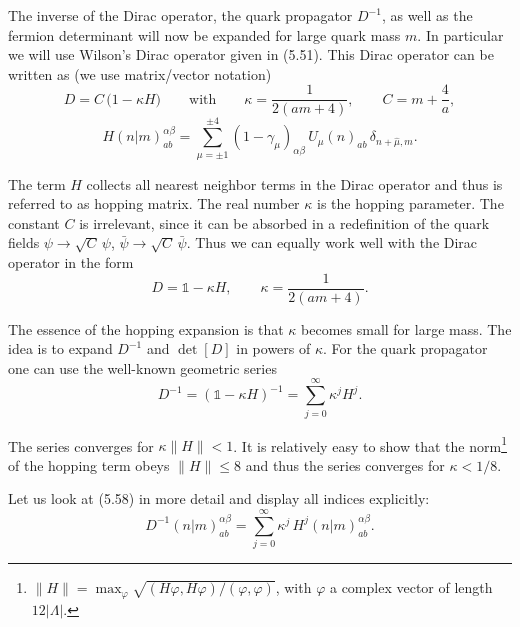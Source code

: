 The inverse of the Dirac operator, the quark propagator $D^{-1}$, as well as
the fermion determinant will now be expanded for large quark mass $m$. In
particular we will use Wilson's Dirac operator given in (5.51). This Dirac
operator can be written as (we use matrix/vector notation)
\begin{equation}
  D = C\,\big(1 - \kappa H\big)
  \qquad \text{with} \qquad
  \kappa = \frac{1}{2(am+4)}, \qquad C = m + \frac{4}{a},
\end{equation}
\begin{equation}
  H(n|m)^{\alpha\beta}_{ab} = \sum_{\mu=\pm1}^{\pm4}(1-\gamma_\mu)_{\alpha\beta}\,
    U_\mu(n)_{ab}\,\delta_{n+\hat{\mu},m} .
\end{equation}

The term $H$ collects all nearest neighbor terms in the Dirac operator and thus
is referred to as hopping matrix. The real number $\kappa$ is the hopping parameter.
The constant $C$ is irrelevant, since it can be absorbed in a redefinition of the
quark fields $\psi \to \sqrt{C}\,\psi$, $\bar{\psi} \to \sqrt{C}\,\bar{\psi}$. Thus we can equally work well with the
Dirac operator in the form
\begin{equation}
  D = \mathbb{1} - \kappa H, \qquad \kappa = \frac{1}{2(am+4)} .
\end{equation}

The essence of the hopping expansion is that $\kappa$ becomes small for large
mass. The idea is to expand $D^{-1}$ and $\det[D]$ in powers of $\kappa$. For the quark
propagator one can use the well-known geometric series
\begin{equation}
  D^{-1} = (\mathbb{1} - \kappa H)^{-1} = \sum_{j=0}^{\infty}\kappa^j H^j .
\end{equation}

The series converges for $\kappa\|H\| < 1$. It is relatively easy to show that the norm\footnote{$\|H\| = \max_\varphi \sqrt{(H\varphi, H\varphi)/(\varphi, \varphi)}$, with $\varphi$ a complex vector of length $12|\Lambda|$.}
of the hopping term obeys $\|H\| \leq 8$ and thus the series converges for $\kappa < 1/8$.

Let us look at (5.58) in more detail and display all indices explicitly:
\begin{equation}
  D^{-1}(n|m)^{\alpha\beta}_{ab} = \sum_{j=0}^{\infty}\kappa^j\,H^j(n|m)^{\alpha\beta}_{ab} .
\end{equation}


